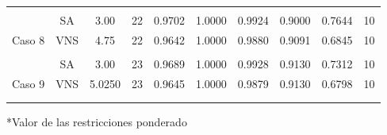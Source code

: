 \begin{table}
{\begin{tabular}{cccccccccc}
			&     &                                                                      &                                                                    &                                                         &        &        &        &        &              \\
			\multicolumn{1}{c|}{}                         & SA  & 3.00                                                                 & 22                                                                 & 0.9702                                                  & 1.0000 & 0.9924 & 0.9000 & 0.7644 & 10           \\
			\multicolumn{1}{c|}{\multirow{-2}{*}{Caso 8}} & VNS & 4.75                                                               & 22                                                                 & 0.9642                                                  & 1.0000 & 0.9880 & 0.9091 & 0.6845 & 10           \\
			&     &                                                                      &                                                                    &                                                         &        &        &        &        &              \\
			\multicolumn{1}{c|}{}                         & SA  & 3.00                                                                 & 23                                                                 & 0.9689                                                  & 1.0000 & 0.9928 & 0.9130 & 0.7312 & 10           \\
			\multicolumn{1}{c|}{\multirow{-2}{*}{Caso 9}} & VNS & 5.0250                                                               & 23                                                                 & 0.9645                                                  & 1.0000 & 0.9879 & 0.9130 & 0.6798 & 10           \\
			&     &                                                                      &                                                                    &                                                         &        &        &        &        &              \\
			\multicolumn{10}{c}{}                                                                                                                                                                                                                                                                                        \\ \hline
		\end{tabular}%
	}
	\footnotesize{*Valor de las restricciones ponderado}
\end{table}

